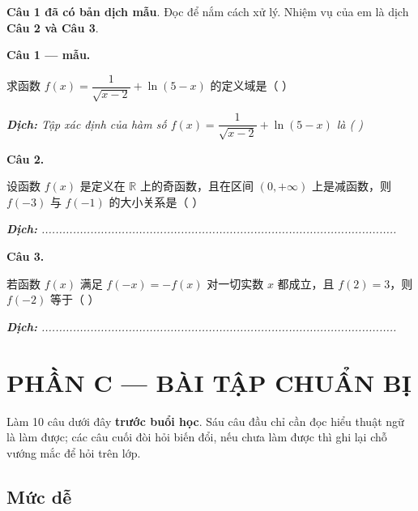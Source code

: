 \documentclass[11pt, a4paper]{article}
\begin{document}
\textbf{Câu 1 đã có bản dịch mẫu}. Đọc để nắm cách xử lý. Nhiệm vụ của em là dịch \textbf{Câu 2 và Câu 3}.

\textbf{Câu 1 — mẫu.}

求函数 $f(x)=\dfrac{1}{\sqrt{x-2}}+\ln(5-x)$ 的定义域是（ ）

\noindent\emph{\textbf{Dịch:} Tập xác định của hàm số $f(x)=\dfrac{1}{\sqrt{x-2}}+\ln(5-x)$ là ( )}

\textbf{Câu 2.}

设函数 $f(x)$ 是定义在 $\mathbb{R}$ 上的奇函数，且在区间 $(0,+\infty)$ 上是减函数，则 $f(-3)$ 与 $f(-1)$ 的大小关系是（ ）

\noindent\emph{\textbf{Dịch:} ......................................................................................................}

\textbf{Câu 3.}

若函数 $f(x)$ 满足 $f(-x)=-f(x)$ 对一切实数 $x$ 都成立，且 $f(2)=3$，则 $f(-2)$ 等于（ ）

\noindent\emph{\textbf{Dịch:} ......................................................................................................}

\section{PHẦN C — BÀI TẬP CHUẨN BỊ}

Làm 10 câu dưới đây \textbf{trước buổi học}. Sáu câu đầu chỉ cần đọc hiểu thuật ngữ là làm được; các câu cuối đòi hỏi biến đổi, nếu chưa làm được thì ghi lại chỗ vướng mắc để hỏi trên lớp.

\subsection{Mức dễ}
\end{document}
